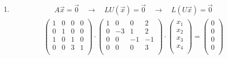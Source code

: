 \documentclass{article}
\begin{document}
\begin{enumerate}
    \item \begin{align*}
        A\vec{x} = \vec{0} \quad\rightarrow\quad LU(\vec{x}) = \vec{0} \quad\rightarrow\quad L(U\vec{x}) = \vec{0}
    \end{align*}
    \begin{align*}
        \begin{pmatrix}
            1 & 0 & 0 & 0 \\
            0 & 1 & 0 & 0 \\
            1 & 0 & 1 & 0 \\
            0 & 0 & 3 & 1 \\
        \end{pmatrix} \cdot 
        \begin{pmatrix}
            1 & 0 & 0 & 2 \\
            0 & -3 & 1 & 2 \\
            0 & 0 & -1 & -1 \\
            0 & 0 & 0 & 3 \\
        \end{pmatrix} \cdot \begin{pmatrix}
            x_1 \\ x_2 \\ x_3 \\ x_4 \\
        \end{pmatrix} =
        \begin{pmatrix}
            0 \\ 0 \\ 0 \\ 0 \\ 
        \end{pmatrix}
    \end{align*}


\end{enumerate}
\end{document}
